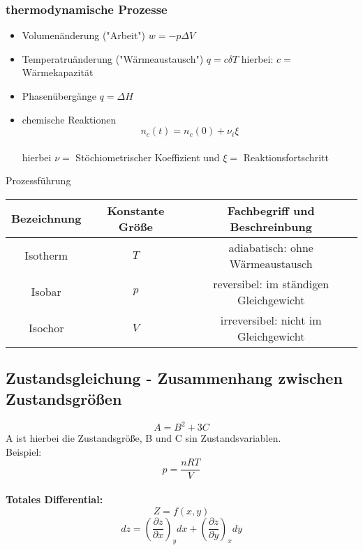 \documentclass[a4paper]{article}
\begin{document}
\subsubsection{thermodynamische Prozesse}
\begin{itemize}
    \item Volumenänderung ("Arbeit") $w = -p \Delta V$
    \item Temperatruänderung ("Wärmeaustausch") $q = c \delta T$ hierbei: $c =$ Wärmekapazität
    \item Phasenübergänge $q = \Delta H$
    \item chemische Reaktionen \\ \begin{equation*}
        n_c(t)=n_c(0)+\nu_i\xi
    \end{equation*}\\hierbei $\nu =$ Stöchiometrischer Koeffizient und $\xi =$ Reaktionsfortschritt
\end{itemize}
\begin{center}
    Prozessführung
    \begin{tabular}{c c c} 
        \hline
        Bezeichnung & Konstante Größe & Fachbegriff und Beschreinbung \\ 
        \hline
        Isotherm & $T$ & adiabatisch: ohne Wärmeaustausch \\ 
        Isobar & $p$ & reversibel: im ständigen Gleichgewicht\\ 
        Isochor & $V$ & irreversibel: nicht im Gleichgewicht\\
        \hline
       \end{tabular}
\end{center}
\subsection{Zustandsgleichung - Zusammenhang zwischen Zustandsgrößen}
\begin{equation*}
    A = B^2 + 3C
\end{equation*}
A ist hierbei die Zustandsgröße, B und C sin Zustandsvariablen.\\
Beispiel:
\begin{equation*}
    p = \frac{nRT}{V}
\end{equation*}
\\
\textbf{Totales Differential:}\\
\begin{equation*}
    Z = f(x,y)
\end{equation*}
\begin{equation*}
    dz=\left(\frac{\partial z}{\partial x}\right)_ydx+\left(\frac{\partial z}{\partial y}\right)_xdy
\end{equation*}
\end{document}
